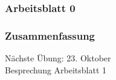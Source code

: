 \documentclass[9pt,german]{beamer}%
\begin{document}
\maketitle%
\addtocounter{framenumber}{-1}%

\begin{frame}
  \frametitle{Arbeitsblatt 0}%
\tableofcontents[hideallsubsections]
\end{frame}

\def\kap{1}%

\def\kap{2}%

\def\kap{3}%

\def\kap{4}%


\def\kap{5}%

\def\kap{6}%



\begin{frame}
  \frametitle{Zusammenfassung}%
\tableofcontents[hideallsubsections]
\end{frame}

\begin{frame}
\centering
\Huge{}
\vspace{2cm}

{\LARGE
N\"achste \"Ubung: 23. Oktober\\
Besprechung Arbeitsblatt 1
}
\end{frame}


\end{document}
